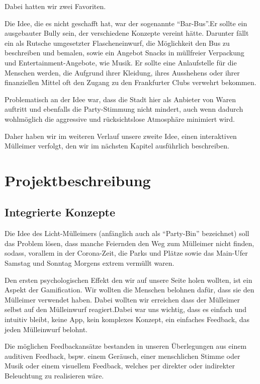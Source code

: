     Dabei hatten wir zwei Favoriten.

    Die Idee, die es nicht geschafft hat, war der sogenannte \enquote{Bar-Bus}.Er sollte ein ausgebauter Bully sein, der verschiedene Konzepte vereint hätte. Darunter fällt ein  als Rutsche umgesetzter Flascheneinwurf, die Möglichkeit den Bus zu beschreiben und bemalen, sowie ein Angebot Snacks in müllfreier Verpackung und Entertainment-Angebote, wie Musik.
    Er sollte eine Anlaufstelle für die Menschen werden, die Aufgrund ihrer Kleidung, ihres Ausshehens oder ihrer finanziellen Mittel oft den Zugang  zu den Frankfurter Clubs verwehrt bekommen.

    Problematisch an der Idee war, dass die Stadt hier als Anbieter von Waren auftritt und ebenfalls die Party-Stimmung nicht mindert, auch wenn dadurch wohlmöglich die aggressive und rücksichtslose Atmosphäre minimiert wird.

    Daher haben wir im weiteren Verlauf unsere zweite Idee, einen interaktiven Mülleimer verfolgt, den wir im nächsten Kapitel ausführlich beschreiben.


\chapter{Projektbeschreibung}

\section{Integrierte Konzepte}
    
    Die Idee des Licht-Mülleimers (anfänglich auch als \enquote{Party-Bin} bezeichnet) soll das Problem lösen, dass manche Feiernden den Weg zum Mülleimer nicht finden, sodass, vorallem in der Corona-Zeit, die Parks und Plätze sowie das Main-Ufer Samstag und Sonntag Morgens extrem vermüllt waren.

    Den ersten psychologischen Effekt den wir auf unsere Seite holen wollten, ist ein Aspekt der Gamification. Wir wollten die Menschen belohnen dafür, dass sie den Mülleimer verwendet haben. Dabei wollten wir erreichen dass der Mülleimer selbst auf den Mülleinwurf reagiert.Dabei war uns wichtig, dass es einfach und intuitiv bleibt, keine App, kein komplexes Konzept, ein einfaches Feedback, das jeden Mülleinwurf belohnt.

    Die möglichen Feedbackansätze bestanden in unseren Überlegungen aus einem auditiven Feedback, bspw. einem Geräusch, einer menschlichen Stimme oder  Musik oder einem visuellem Feedback, welches per direkter oder indirekter Beleuchtung zu realisieren wäre.

